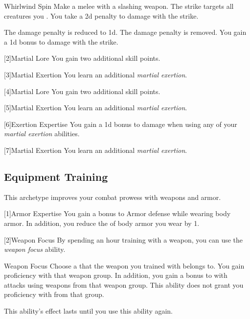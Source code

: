{            \begin{ability}{Whirlwind Spin}
                Make a melee  with a slashing weapon.
                The strike targets all creatures you .
                You take a \minus2d penalty to damage with the strike.

                \rankline
                 The damage penalty is reduced to \minus1d.
                 The damage penalty is removed.
                 You gain a \plus1d bonus to damage with the strike.
            \end{ability}
        }

        [2]{Martial Lore} You gain two additional skill points.

        [3]{Martial Exertion}
        You learn an additional \textit{martial exertion}.

        [4]{Martial Lore} You gain two additional skill points.

        [5]{Martial Exertion} 
        You learn an additional \textit{martial exertion}.

        [6]{Exertion Expertise} You gain a \plus1d bonus to damage when using any of your \textit{martial exertion} abilities.

        [7]{Martial Exertion}
        You learn an additional \textit{martial exertion}.

    \subsection{Equipment Training}
        This archetype improves your combat prowess with weapons and armor.

        [1]{Armor Expertise}
        You gain a  bonus to Armor defense while wearing body armor.
        In addition, you reduce the  of body armor you wear by 1.

        [2]{Weapon Focus} By spending an hour training with a weapon, you can use the \textit{weapon focus} ability.
        \begin{ability}{Weapon Focus}
            Choose a  that the weapon you trained with belongs to.
            You gain proficiency with that weapon group.
            In addition, you gain a  bonus to  with attacks using weapons from that weapon group.
            This ability does not grant you proficiency with  from that group.

            This ability's effect lasts until you use this ability again.
        \end{ability}

